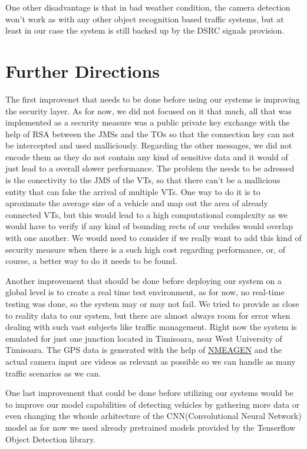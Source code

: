 \documentclass[17pt]{report}
\begin{document}
\indent 
One other disadvantage is that in bad weather condition, the camera 
detection won't work as with any other object recognition based 
traffic systems, but at least in our case the system is still
backed up by the DSRC signals provision.

\chapter{Further Directions}
\indent \indent
The first improvenet that needs to be done before using our systems is 
improving the security layer. As for now, we did not focused on it
that much, all that was implemented as a security measure was a 
public private key exchange with the help of RSA between the JMSs 
and the TOs so that the connection key can not be intercepted
and used malliciously. Regarding the other messages, we did not 
encode them as they do not contain any kind of sensitive data and 
it would of just lead to a overall slower performance. The problem  
the needs to be adressed is the conectivity to the JMS of the VTs, so 
that there can't be a mallicious entity that can fake the arrival of
multiple VTs. One way to do it is to aproximate the average size of
a vehicle and map out the area of already connected VTs,
but this would lead to a high computational complexity as we
would have to verify if any kind of bounding rects of our vechiles
would overlap with one another. We would need to consider if we
really want to add this kind of security measure when there is a
such high cost regarding performance, or, of course, a better way
to do it needs to be found. 

\indent 
Another improvement that should be done before deploying our system on a 
global level is to create a real time test environment, as for now,
no real-time testing was done, so the system may or may not fail. 
We tried to provide as close to reality data to our system, but there 
are almost always room for error when dealing with such vast subjects
like traffic management. Right now the system is emulated for just
one junction located in Timisoara, near West University of Timisoara.
The GPS data is generated with the help of 
\href{https://www.nmeagen.org/}{NMEAGEN} and the actual camera input 
are videos as relevant as possible so we can handle as many traffic 
scenarios as we can.

\indent
One last improvement that could be done before utilizing our systems 
would be to improve our model capabilities of detecting vehicles by 
gathering more data or even changing the whoule arhitecture of the 
CNN(Convolutional Neural Network) model as for now we used already 
pretrained models provided by the Tenserflow Object Detection library.
\pagebreak
\printbibliography
\end{document}
